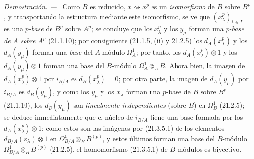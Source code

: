 \documentclass[10pt,oneside]{book}
\newcommand{\oldpage}[2][]{%
  \setcounter{footnote}{0}%
  \marginpar{\scriptsize\textbf{#1}~|~#2}\ignorespaces}
\newenvironment{proof}{%
  \par\medskip\noindent\textit{Demostración. ---\ }}{\par}
\begin{document}
\begin{proof}
\oldpage[0\textsubscript{IV-1}]{162}
Como $B$ es reducido, $x\rightsquigarrow x^p$ es un \emph{isomorfismo} de $B$
sobre $B^p$, y transportando la estructura mediante este isomorfismo, se ve
que $(x_\lambda^p)_{\lambda\in L}$ es una \emph{$p$-base} de
$B^p$ sobre $A^p$; se concluye que los $x_\lambda^p$ y los $y_\mu$ forman
una \emph{$p$-base de} $A$ \emph{sobre} $A^p$ (21.1.10); por consiguiente (21.1.5, (ii) y
21.2.5) los $d_A(x_\lambda^p)$ y los $d_A(y_\mu)$ forman una \emph{base} del $A$-módulo
$\Omega^1_A$; por tanto, los $d_A(x_\lambda^p)\otimes1$ y los $d_A(y_\mu)\otimes1$
forman una base del $B$-módulo $\Omega^1_A\otimes_A B$. Ahora bien, la imagen de $d_A(x_\lambda^p)\otimes1$ por
$i_{B/A}$ es $d_B(x_\lambda^p)=0$; por otra parte, la imagen de $d_A(y_\mu)$
por $i_{B/A}$ es $d_B(y_\mu)$, y como los $y_\mu$ y los $x_\lambda$
forman una $p$-base de $B$ sobre $B^p$ (21.1.10), los $d_B(y_\mu)$ son
\emph{linealmente independientes} (sobre $B$) en $\Omega^1_B$ (21.2.5); se deduce inmediatamente
que el núcleo de $i_{B/A}$ tiene una base formada por
los $d_A(x_\lambda^p)\otimes1$; como estos son las imágenes por (21.3.5.1) de
los elementos $d_{B/A}(x_\lambda)\otimes1$ en $\Omega^1_{B/A}\otimes_B B^{(p)}$, y estos últimos
forman una base del $B$-módulo $\Omega^1_{B/A}\otimes_B B^{(p)}$ (21.2.5), el
homomorfismo (21.3.5.1) de $B$-módulos es biyectivo.
\end{proof}
\end{document}
